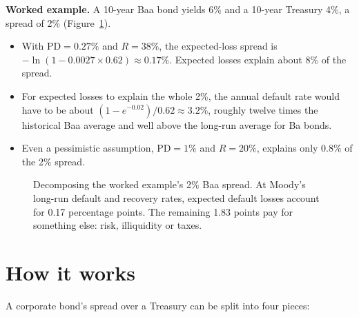 \textbf{Worked example.} A 10-year Baa bond yields 6\% and a 10-year Treasury 4\%, a spread of 2\% (Figure~\ref{fig:17-decomp}).

\begin{itemize}
  \item With $\mathrm{PD} = 0.27\%$ and $R = 38\%$, the expected-loss spread is $-\ln(1 - 0.0027 \times 0.62) \approx 0.17\%$. Expected losses explain about 8\% of the spread.
  \item For expected losses to explain the whole 2\%, the annual default rate would have to be about $(1 - e^{-0.02})/0.62 \approx 3.2\%$, roughly twelve times the historical Baa average and well above the long-run average for Ba bonds.
  \item Even a pessimistic assumption, $\mathrm{PD} = 1\%$ and $R = 20\%$, explains only 0.8\% of the 2\% spread.
\end{itemize}

\begin{figure}[htbp]
\centering
{}
\caption{Decomposing the worked example's 2\% Baa spread. At Moody's long-run default and recovery rates, expected default losses account for 0.17 percentage points. The remaining 1.83 points pay for something else: risk, illiquidity or taxes.}
\label{fig:17-decomp}
\end{figure}

\section{How it works}
\label{sec:17-how}

A corporate bond's spread over a Treasury can be split into four pieces:

